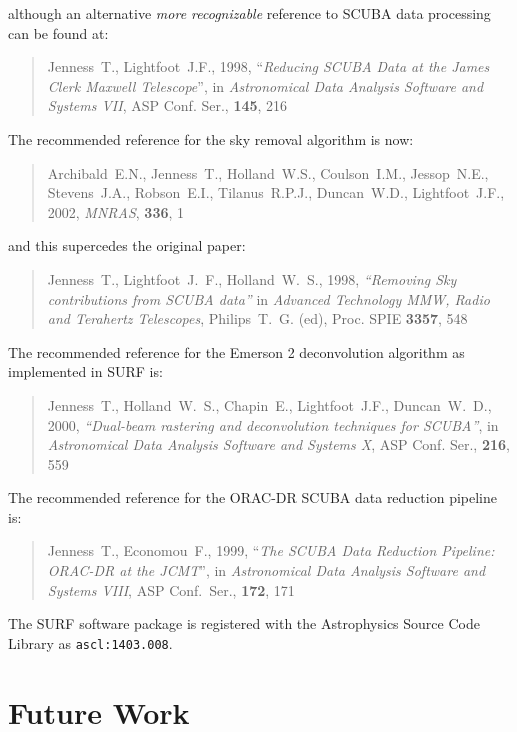 \documentclass[twoside,11pt]{starlink}
\begin{document}
although an alternative \textit{more recognizable} reference to SCUBA data processing
can be found at:

\begin{quote}
Jenness~T., Lightfoot~J.F., 1998, ``\textit{Reducing SCUBA Data at the James
  Clerk Maxwell Telescope}'', in
\textit{Astronomical Data Analysis Software and Systems VII}, ASP Conf. Ser.,
\textbf{145}, 216
\end{quote}

The recommended reference for the sky removal algorithm is now:

\begin{quote}
Archibald~E.N., Jenness~T., Holland~W.S., Coulson~I.M., Jessop~N.E.,
Stevens~J.A., Robson~E.I., Tilanus~R.P.J., Duncan~W.D., Lightfoot~J.F., 2002,
\textit{MNRAS}, \textbf{336}, 1
\end{quote}

and this supercedes the original paper:

\begin{quote}
Jenness~T., Lightfoot~J.~F., Holland~W.~S., 1998,
\textit{``Removing Sky contributions from SCUBA data''} in \textit{Advanced
Technology MMW, Radio and Terahertz Telescopes}, Philips~T.~G. (ed),
Proc. SPIE \textbf{3357}, 548
\end{quote}

The recommended reference for the Emerson 2 deconvolution algorithm
as implemented in SURF is:

\begin{quote}
Jenness~T., Holland~W.~S., Chapin~E., Lightfoot~J.F., Duncan~W.~D., 2000,
\textit{``Dual-beam rastering and deconvolution techniques for SCUBA''}, in
\textit{Astronomical Data Analysis Software and Systems X}, ASP Conf. Ser.,
\textbf{216}, 559
\end{quote}

The recommended reference for the ORAC-DR SCUBA data reduction pipeline is:

\begin{quote}
Jenness~T., Economou~F.,  1999, ``\textit{The SCUBA Data Reduction Pipeline:
ORAC-DR at the JCMT}'', in \textit{Astronomical Data Analysis Software and
Systems VIII}, ASP Conf.\ Ser., \textbf{172}, 171
\end{quote}

The SURF software package is registered with the Astrophysics Source Code
Library as \texttt{ascl:1403.008}.

\section{Future Work\label{future}}
\end{document}
